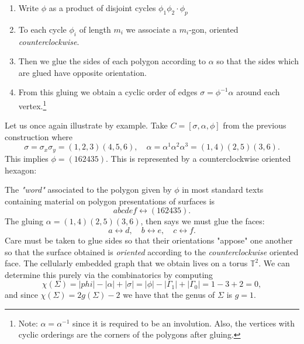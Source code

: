 \documentclass[11pt,oneside]{amsbook}
\numberwithin{equation}{section}
\theoremstyle{plain}
\theoremstyle{definition}
\theoremstyle{remark}
\newcommand{\sidenote}[1]{\footnote{#1}}
\newcommand{\TT}{\mathbb{T}}
\begin{document}
	\begin{enumerate}
		\item Write $\phi$ as a product of disjoint cycles $\phi_1 \phi_2 \cdot \phi_p$
		\item To each cycle $\phi_i$ of length $m_i$ we associate a $m_i$-gon, oriented \textit{counterclockwise}. 
		\item Then we glue the sides of each polygon according to $\alpha$ so that the sides which are glued have opposite orientation. 
		\item From this gluing we obtain a cyclic order of edges $\sigma = \phi^{-1}\alpha$ around each vertex.\sidenote{Note: $\alpha = \alpha^{-1}$ since it is required to be an involution. Also, the vertices with cyclic orderings are the corners of the polygons after gluing.}
	\end{enumerate}
	
	Let us once again illustrate by example. Take $C = [\sigma, \alpha, \phi]$ from the previous construction where 
	\[ \sigma = \sigma_x \sigma_y = (1,2,3)(4,5,6), \quad \alpha = \alpha^1\alpha^2\alpha^3 = (1,4)(2,5)(3,6).\]
	This implies $\phi = (162435)$. This is represented by a counterclockwise oriented hexagon:
	
	
	The \textit{"word"} associated to the polygon given by $\phi$ in most standard texts containing material on polygon presentations of surfaces is 
	\[ abcdef \leftrightarrow (162435). \]
	The gluing $\alpha = (1,4)(2,5)(3,6)$, then says we must glue the faces:
	\[ a \leftrightarrow d, \quad b \leftrightarrow e, \quad c \leftrightarrow f.\]
	Care must be taken to glue sides so that their orientations "appose" one another so that the surface obtained is \textit{oriented} according to the \textit{counterclockwise} oriented face. The cellularly embedded graph that we obtain lives on a torus $\TT^2$. We can determine this purely via the combinatorics by computing
	\[ \chi(\Sigma) = |phi| - |\alpha| + |\sigma| = |\phi|-|\Gamma_1|+|\Gamma_0|= 1-3+2 = 0,\]
	and since $\chi(\Sigma) = 2g(\Sigma)-2$ we have that the genus of $\Sigma$ is $g = 1$. 
	
\end{document}
